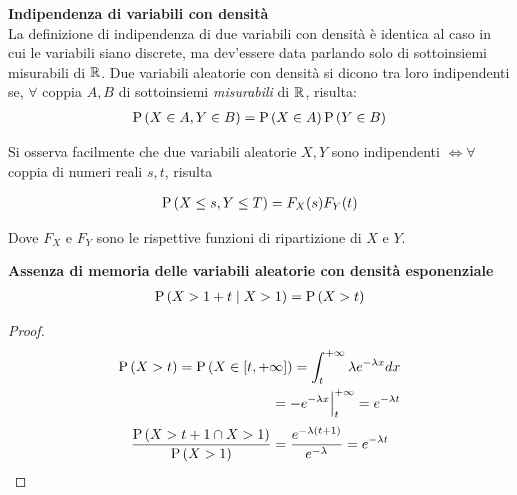 \begin{defn}
    \label{defn:indipendenzac}
    \textbf{Indipendenza di variabili con densità} \\
    La definizione di indipendenza di due variabili con densità è identica al
    caso in cui le variabili siano discrete, ma dev'essere data parlando solo di
    sottoinsiemi misurabili di $\mathbb{R}$. Due variabili aleatorie con densità si
    dicono tra loro indipendenti se, $\forall$ coppia $A,B$ di sottoinsiemi
    \textit{misurabili} di $\mathbb{R}$, risulta:
    \begin{equation*}
        \begin{aligned}
            \text{P}\left(X \in A, Y \in B\right) = \text{P}\left(X \in A\right)\text{P}\left(Y \in B\right)
        \end{aligned}
    \end{equation*}

    Si osserva facilmente che due variabili aleatorie $X,Y$ sono indipendenti
    $\iff \forall$ coppia di numeri reali $s,t$, risulta

    \begin{equation*}
        \begin{aligned}
            \text{P}\left(X \leq s, Y \leq T\right) = F_X(s)F_Y(t)
        \end{aligned}
    \end{equation*}

    Dove $F_X$ e $F_Y$ sono le rispettive funzioni di ripartizione di $X$ e $Y$.
\end{defn}


\begin{defn}
    \textbf{Assenza di memoria delle variabili aleatorie con densità
    esponenziale} \\
    \begin{equation*}
        \begin{aligned}
            \text{P}\left(X > 1 + t \mid X > 1\right) = \text{P}\left(X > t\right)
        \end{aligned}
    \end{equation*}

    \begin{proof}
        \begin{equation*}
            \begin{aligned}
                \text{P}\left(X > t\right) = \text{P}\left(X \in [t, +\infty]\right) = \int_{t}^{+\infty} \lambda e^{-\lambda x} dx \\
                = -e^{-\lambda x} \Big|_{t}^{+\infty} = e^{-\lambda t}
            \end{aligned}
        \end{equation*}
        \begin{equation*}
            \begin{aligned}
                \frac{\text{P}\left(X > t + 1 \cap X > 1\right)}{\text{P}\left(X > 1\right)} = \frac{e^{-\lambda (t + 1)}}{e^{-\lambda}} = e^{-\lambda t}
            \end{aligned}
        \end{equation*}
    \end{proof}
\end{defn}

